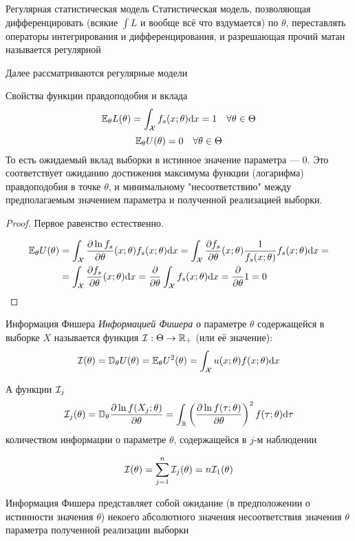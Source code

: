 \begin{dfn}{Регулярная статистическая модель}
Статистическая модель,
позволяющая
дифференцировать (всякие $\int L$ и вообще всё что вздумается) по $\theta$,
переставлять операторы интегрирования и дифференцирования,
и разрешающая прочий матан называется регулярной

Далее рассматриваются регулярные модели
\end{dfn}

\begin{thm}{Свойства функции правдоподобия и вклада}
$$\mathbb E_\theta L(\theta) = \int_\mathcal X f_s(x;\theta) \mathrm d x = 1 \quad\forall\theta\in\Theta$$
$$\mathbb E_\theta U(\theta) = 0 \quad\forall\theta\in\Theta$$
То есть ожидаемый вклад выборки в истинное значение параметра --- 0.
Это соответствует ожиданию достижения максимума функции (логарифма) правдоподобия в точке $\theta$,
и минимальному "несоответствию" между предполагаемым значением параметра и полученной реализацией выборки.
\end{thm}
\begin{proof}
Первое равенство естественно.

$$\begin{aligned}
\mathbb E_\theta U(\theta)
&= \int_\mathcal X \frac{\partial\ln f_s}{\partial\theta}(x;\theta) f_s(x;\theta)\mathrm d x
 = \int_\mathcal X \frac{\partial f_s}{\partial\theta}(x;\theta) \frac1{f_s(x;\theta)} f_s(x;\theta)\mathrm d x=\\
&= \int_\mathcal X \frac{\partial f_s}{\partial\theta}(x;\theta)\mathrm d x
 = \frac{\partial}{\partial\theta} \int_\mathcal X f_s(x;\theta)\mathrm d x
 = \frac{\partial}{\partial\theta} 1
 = 0
\end{aligned}$$
\end{proof}

\begin{dfn}{Информация Фишера}
\emph{Информацией Фишера}
о параметре $\theta$
содержащейся в выборке $X$
называется функция $\mathcal I:\Theta\to\mathbb R_+$ (или её значение):
$$\mathcal I(\theta) = \mathbb D_\theta U(\theta) = \mathbb E_\theta U^2(\theta) = \int_\mathcal X u(x;\theta) f(x;\theta) \mathrm d x$$

А функции $\mathcal I_j$
$$\mathcal I_j(\theta)
= \mathbb D_\theta \frac{\partial\ln f(X_j;\theta)}{\partial\theta}
= \int_\mathbb R \left(\frac{\partial\ln f(\tau;\theta)}{\partial\theta}\right)^2 f(\tau;\theta) \mathrm d \tau $$
количеством информации о параметре $\theta$,
содержащейся в $j$-м наблюдении

$$\mathcal I(\theta) = \sum_{j=1}^n \mathcal I_j(\theta) = n\mathcal I_1(\theta)$$

Информация Фишера
представляет собой ожидание (в предположении о истинности значения $\theta$)
некоего абсолютного значения несоответствия значения $\theta$ параметра
полученной реализации выборки
\end{dfn}

